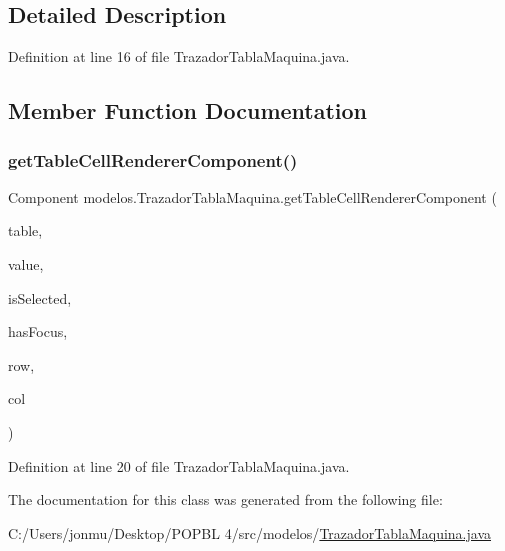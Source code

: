 \subsection{Detailed Description}


Definition at line 16 of file Trazador\+Tabla\+Maquina.\+java.



\subsection{Member Function Documentation}
\mbox{\label{classmodelos_1_1_trazador_tabla_maquina_a2ea391f01832f424c6e212bd8ff86484}} 
\subsubsection{\texorpdfstring{get\+Table\+Cell\+Renderer\+Component()}{getTableCellRendererComponent()}}
{\footnotesize\ttfamily Component modelos.\+Trazador\+Tabla\+Maquina.\+get\+Table\+Cell\+Renderer\+Component (\begin{DoxyParamCaption}\item[{J\+Table}]{table,  }\item[{Object}]{value,  }\item[{boolean}]{is\+Selected,  }\item[{boolean}]{has\+Focus,  }\item[{int}]{row,  }\item[{int}]{col }\end{DoxyParamCaption})}



Definition at line 20 of file Trazador\+Tabla\+Maquina.\+java.



The documentation for this class was generated from the following file\+:\begin{DoxyCompactItemize}
\item 
C\+:/\+Users/jonmu/\+Desktop/\+P\+O\+P\+B\+L 4/src/modelos/\mbox{\hyperlink{_trazador_tabla_maquina_8java}{Trazador\+Tabla\+Maquina.\+java}}\end{DoxyCompactItemize}
